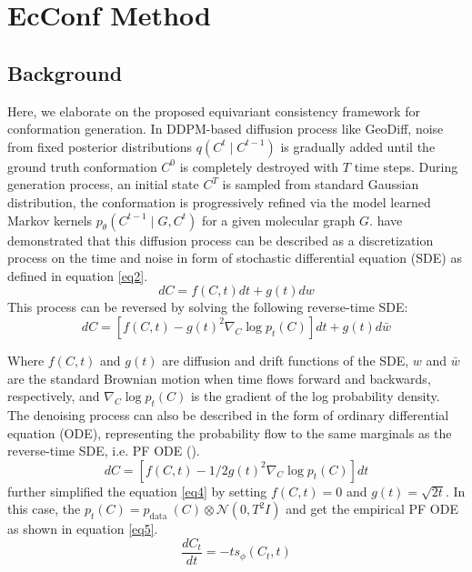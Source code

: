 \documentclass{article} %
\begin{document}
\section{EcConf Method}
\subsection{Background}
Here, we elaborate on the proposed equivariant consistency framework for conformation generation. In DDPM-based diffusion process like GeoDiff, noise from fixed posterior distributions $q\left(C^t \mid C^{t-1}\right)$ is gradually added until the ground truth conformation $C^0$ is completely destroyed with $T$ time steps. During generation process, an initial state $C^T$ is sampled from standard Gaussian distribution, the conformation is progressively refined via the model learned Markov kernels $p_\theta\left(C^{t-1} \mid G, C^t\right)$ for a given molecular graph $G$. \cite{song2020score} have demonstrated that this diffusion process can be described as a discretization process on the time and noise in form of stochastic differential equation (SDE) as defined in equation \ref{eq2}.
\begin{equation}
	d C=f(C, t) d t+g(t) d w
	\label{eq2}
\end{equation}
This process can be reversed by solving the following reverse-time SDE:
\begin{equation}
	d C=\left[f(C, t)-g(t)^2 \nabla_C \log p_t(C)\right] d t+g(t) d \bar{w}
	\label{eq3}
\end{equation}


Where $f(C, t)$ and $g(t)$ are diffusion and drift functions of the SDE,  $w$ and $\bar{w}$ are the standard Brownian motion when time flows forward and backwards, respectively, and $\nabla_C \log p_t(C)$ is the gradient of the log probability density. The denoising process can also be described in the form of ordinary differential equation (ODE), representing the probability flow to the same marginals as the reverse-time SDE, i.e. PF ODE (\cite{song2020score}).
\begin{equation}
	d C=\left[f(C, t)-1 / 2 g(t)^2 \nabla_C \log p_t(C)\right] d t
	\label{eq4}
\end{equation}
\cite{karras2022elucidating} further simplified the equation \ref{eq4} by setting $f(C, t)=0$ and $g(t)=\sqrt{2 t}$. In this case, the $p_t(C)=p_{\text {data }}(C) \otimes \mathcal{N}\left(0, T^2 I\right)$  and get the empirical PF ODE as shown in equation \ref{eq5}.
\begin{equation}
	\frac{d C_t}{d t}=-t s_\phi\left(C_t, t\right)
	\label{eq5}
\end{equation}
\end{document}
